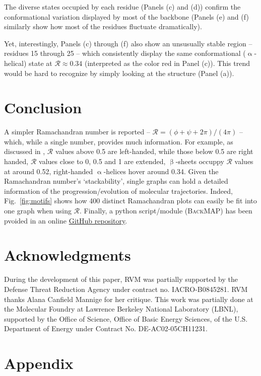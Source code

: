 \documentclass[fleqn,10pt,lineno]{wlpeerj} %
\newcommand{\Fig}[1]{Fig.~\ref{#1}}
\newcommand{\gname}{BackMAP}
\newcommand{\pname}{\textsc{\gname}\xspace}
\newcommand{\rr}{$\mathcal{R}$\xspace}
\begin{document}
The diverse states occupied by each residue (Panels (c) and (d)) confirm the conformational variation displayed by most of the backbone (Panels (e) and (f) similarly show how most of the residues fluctuate dramatically).

Yet, interestingly, Panels (c) through (f) also show an unsusually stable region -- residues 15 through 25 -- which consistently display the same conformational ($\upalpha$-helical) state at $\mathcal{R}\approx0.34$ (interpreted as the color red in Panel (c)). This trend would be hard to recognize by simply looking at the structure (Panel (a)). 

\section*{Conclusion}

A simpler Ramachandran number is reported -- $\mathcal{R} = (\phi+\psi+2\pi)/(4\pi)$ -- which, while a single number, provides much information. For example, as discussed in \cite{Mannige2016}, \rr values above 0.5 are left-handed, while those below 0.5 are right handed, \rr values close to 0, 0.5 and 1 are extended, $\upbeta$-sheets occuppy \rr values at around 0.52, right-handed $\upalpha$-helices hover around 0.34. Given the Ramachandran number's `stackability', single graphs can hold a detailed information of the progression/evolution of molecular trajectories. Indeed, \Fig{fig:motifs} shows how 400 distinct Ramachandran plots can easily be fit into one graph when using \rr. Finally, a python script/module (\pname) has been pvoided in an online \href{https://github.com/ranjanmannige/\gname}{GitHub repository}.

\section*{Acknowledgments}

During the development of this paper, RVM was partially supported by the Defense Threat Reduction Agency under contract no. IACRO-B0845281. RVM thanks Alana Canfield Mannige for her critique. This work was partially done at the Molecular Foundry at Lawrence Berkeley National Laboratory (LBNL), supported by the Office of Science, Office of Basic Energy Sciences, of the U.S. Department of Energy under Contract No. DE-AC02-05CH11231.

\section{Appendix}
\end{document}
